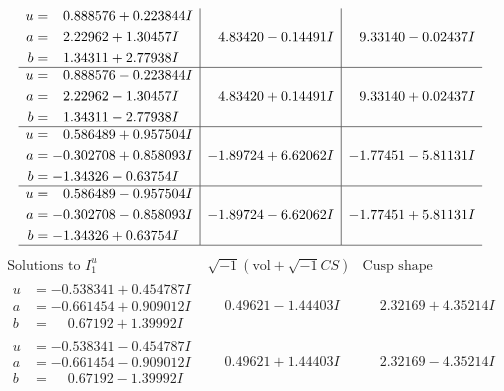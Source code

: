 \documentclass[1p]{elsarticle_modified}
\theoremstyle{definition}
\newcommand{\I}{\sqrt{-1}}
\begin{document}
$$\begin{array}{c|c|c}
\begin{aligned}
u &= \phantom{-}0.888576 + 0.223844 I \\
a &= \phantom{-}2.22962 + 1.30457 I \\
b &= \phantom{-}1.34311 + 2.77938 I\end{aligned}
 & \phantom{-}4.83420 - 0.14491 I & \phantom{-}9.33140 - 0.02437 I \\ \hline\begin{aligned}
u &= \phantom{-}0.888576 - 0.223844 I \\
a &= \phantom{-}2.22962 - 1.30457 I \\
b &= \phantom{-}1.34311 - 2.77938 I\end{aligned}
 & \phantom{-}4.83420 + 0.14491 I & \phantom{-}9.33140 + 0.02437 I \\ \hline\begin{aligned}
u &= \phantom{-}0.586489 + 0.957504 I \\
a &= -0.302708 + 0.858093 I \\
b &= -1.34326 - 0.63754 I\end{aligned}
 & -1.89724 + 6.62062 I & -1.77451 - 5.81131 I \\ \hline\begin{aligned}
u &= \phantom{-}0.586489 - 0.957504 I \\
a &= -0.302708 - 0.858093 I \\
b &= -1.34326 + 0.63754 I\end{aligned}
 & -1.89724 - 6.62062 I & -1.77451 + 5.81131 I\\
 \hline 
 \end{array}$$\newpage$$\begin{array}{c|c|c}  
\text{Solutions to }I^u_{1}& \I (\text{vol} + \sqrt{-1}CS) & \text{Cusp shape}\\
 \hline 
\begin{aligned}
u &= -0.538341 + 0.454787 I \\
a &= -0.661454 + 0.909012 I \\
b &= \phantom{-}0.67192 + 1.39992 I\end{aligned}
 & \phantom{-}0.49621 - 1.44403 I & \phantom{-}2.32169 + 4.35214 I \\ \hline\begin{aligned}
u &= -0.538341 - 0.454787 I \\
a &= -0.661454 - 0.909012 I \\
b &= \phantom{-}0.67192 - 1.39992 I\end{aligned}
 & \phantom{-}0.49621 + 1.44403 I & \phantom{-}2.32169 - 4.35214 I \\ \hline\begin{aligned}

\end{aligned}
\end{array}$$
\end{document}
